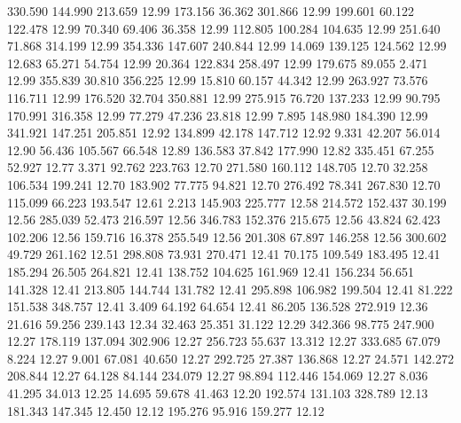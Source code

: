  330.590  144.990  213.659        12.99
 173.156   36.362  301.866        12.99
 199.601   60.122  122.478        12.99
  70.340   69.406   36.358        12.99
 112.805  100.284  104.635        12.99
 251.640   71.868  314.199        12.99
 354.336  147.607  240.844        12.99
  14.069  139.125  124.562        12.99
  12.683   65.271   54.754        12.99
  20.364  122.834  258.497        12.99
 179.675   89.055    2.471        12.99
 355.839   30.810  356.225        12.99
  15.810   60.157   44.342        12.99
 263.927   73.576  116.711        12.99
 176.520   32.704  350.881        12.99
 275.915   76.720  137.233        12.99
  90.795  170.991  316.358        12.99
  77.279   47.236   23.818        12.99
   7.895  148.980  184.390        12.99
 341.921  147.251  205.851        12.92
 134.899   42.178  147.712        12.92
   9.331   42.207   56.014        12.90
  56.436  105.567   66.548        12.89
 136.583   37.842  177.990        12.82
 335.451   67.255   52.927        12.77
   3.371   92.762  223.763        12.70
 271.580  160.112  148.705        12.70
  32.258  106.534  199.241        12.70
 183.902   77.775   94.821        12.70
 276.492   78.341  267.830        12.70
 115.099   66.223  193.547        12.61
   2.213  145.903  225.777        12.58
 214.572  152.437   30.199        12.56
 285.039   52.473  216.597        12.56
 346.783  152.376  215.675        12.56
  43.824   62.423  102.206        12.56
 159.716   16.378  255.549        12.56
 201.308   67.897  146.258        12.56
 300.602   49.729  261.162        12.51
 298.808   73.931  270.471        12.41
  70.175  109.549  183.495        12.41
 185.294   26.505  264.821        12.41
 138.752  104.625  161.969        12.41
 156.234   56.651  141.328        12.41
 213.805  144.744  131.782        12.41
 295.898  106.982  199.504        12.41
  81.222  151.538  348.757        12.41
   3.409   64.192   64.654        12.41
  86.205  136.528  272.919        12.36
  21.616   59.256  239.143        12.34
  32.463   25.351   31.122        12.29
 342.366   98.775  247.900        12.27
 178.119  137.094  302.906        12.27
 256.723   55.637   13.312        12.27
 333.685   67.079    8.224        12.27
   9.001   67.081   40.650        12.27
 292.725   27.387  136.868        12.27
  24.571  142.272  208.844        12.27
  64.128   84.144  234.079        12.27
  98.894  112.446  154.069        12.27
   8.036   41.295   34.013        12.25
  14.695   59.678   41.463        12.20
 192.574  131.103  328.789        12.13
 181.343  147.345   12.450        12.12
 195.276   95.916  159.277        12.12
